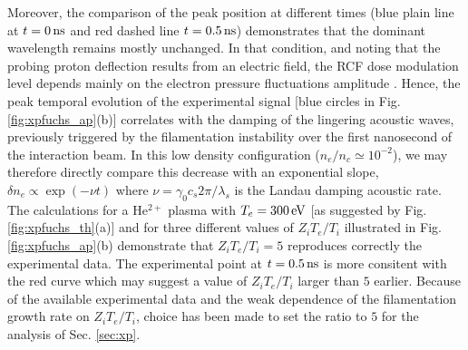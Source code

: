 \documentclass[
 reprint,
 superscriptaddress,
 amsmath,amssymb,
 aps,
]{revtex4-1}
\begin{document}
Moreover, the comparison of the peak position at different times (blue plain line at $t=0\,\rm ns$ and red dashed line $t=0.5\,\rm ns$) demonstrates that the dominant wavelength remains mostly unchanged.  In that condition, and noting that the probing proton deflection results from an electric field, the RCF dose modulation level depends mainly on the electron pressure fluctuations amplitude \cite[]{RSI_protograhyb}.
Hence, the peak temporal evolution of the experimental signal [blue circles in Fig. \ref{fig:xpfuchs_ap}(b)] correlates with the damping of the lingering acoustic waves, previously triggered by the filamentation instability over the first nanosecond of  the interaction beam.
In this low density configuration ($n_e/n_c\simeq10^{-2}$), 
we may therefore directly compare this decrease with an exponential slope, $\delta n_e \propto \exp(-\nu t)$ where $\nu = \gamma_0 c_s 2\pi/\lambda_s$ is the Landau damping acoustic rate. The calculations for a He$^{2+}$ plasma with $T_e=300\, \rm eV$ [as suggested by  Fig. \ref{fig:xpfuchs_th}(a)] and  for three different values of $Z_iT_e/T_i$ illustrated in  Fig. \ref{fig:xpfuchs_ap}(b) demonstrate that $Z_iT_e/T_i=5$ reproduces correctly the experimental data. The experimental point at $t=0.5\,\rm ns$ is more consitent with the red curve which may suggest a value of  $Z_iT_e/T_i $ larger than $5$ earlier. Because of the available experimental data and the weak dependence of the filamentation growth rate on $Z_iT_e/T_i$, choice has been made to set the ratio to  $5$ for the analysis of Sec. \ref{sec:xp}.


\end{document}
